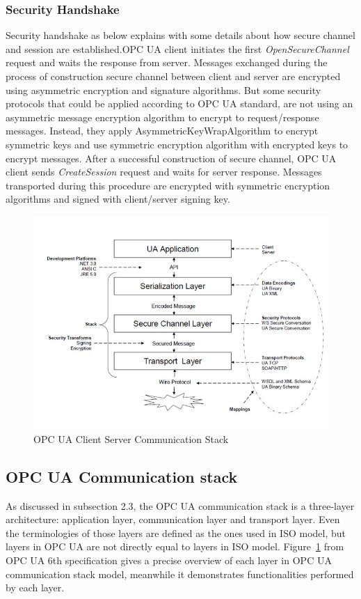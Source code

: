 \documentclass[]{llncs}
\begin{document}
\subsubsection{Security Handshake}
Security handshake as below explains with some details about how secure channel and session are established.OPC UA client initiates the first \emph{OpenSecureChannel} request and waits the response from server. Messages exchanged during the process of construction secure channel between client and server are encrypted using asymmetric encryption and signature algorithms. But some security protocols that could be applied according to OPC UA standard, are not using an asymmetric message encryption algorithm to encrypt to request/response messages. Instead, they apply AsymmetricKeyWrapAlgorithm to encrypt symmetric keys and use symmetric encryption algorithm with encrypted keys to encrypt messages. After a successful construction of secure channel, OPC UA client sends \emph{CreateSession} request and waits for server response. Messages transported during this procedure are encrypted with symmetric encryption algorithms and signed with client/server signing key.
\begin{figure}[!htb]
	\centering
	\includegraphics[width=1\textwidth]{opc_ua_commstack.jpg}
		\caption[ ]{OPC UA Client Server Communication Stack\cite{O2}}
	\label{fig:opc_ua_commstack}
\end{figure}
\subsection{OPC UA Communication stack}
As discussed in subsection 2.3, the OPC UA communication stack is a three-layer architecture: application layer, communication layer and transport layer. Even the terminologies of those layers are defined as the ones used in ISO model, but layers in OPC UA are not directly equal to layers in ISO model. Figure~\ref{fig:opc_ua_commstack} from OPC UA  6th specification\cite{O6} gives a precise overview of each layer in OPC UA communication stack model, meanwhile it demonstrates functionalities performed by each layer.
\end{document}
